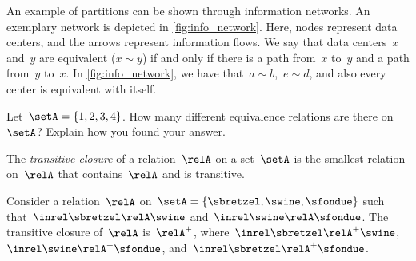 \begin{example}
    An example of partitions can be shown through information networks.
    An exemplary network is depicted in \cref{fig:info_network}.
    Here, nodes represent data centers, and the arrows represent information flows.
    We say that data centers~$x$ and~$y$ are equivalent ($x\sim y$) if and only if there is a path from~$x$ to~$y$ and a path from~$y$ to~$x$.
    In \cref{fig:info_network}, we have that~$a\sim b$,~$e\sim d$, and also every center is equivalent with itself.
\end{example}

\begin{gradedexercise}
    \label{ex:CountingEquivalenceRelations}
    Let~$\setA = \{ 1, 2, 3, 4 \}$.
    How many different equivalence relations are there on $\setA$?
    Explain how you found your answer.
\end{gradedexercise}


\begin{ctdefinition}
    \label{def:transitive-closure}
    The \emph{transitive closure} of a relation~$\relA$ on a set~$\setA$ is the smallest relation on~$\relA$ that contains~$\relA$ and is transitive.
\end{ctdefinition}

\begin{example}
    Consider a relation~$\relA$ on~$\setA=\{\sbretzel,\swine,\sfondue\}$ such that~$\inrel \sbretzel \relA \swine$ and~$\inrel \swine \relA \sfondue$.
    The transitive closure of~$\relA$ is~$\relA^+$, where~$\inrel \sbretzel \relA^+ \swine$,~$\inrel \swine \relA^+ \sfondue$, and~$\inrel \sbretzel \relA^+ \sfondue$.
\end{example}
